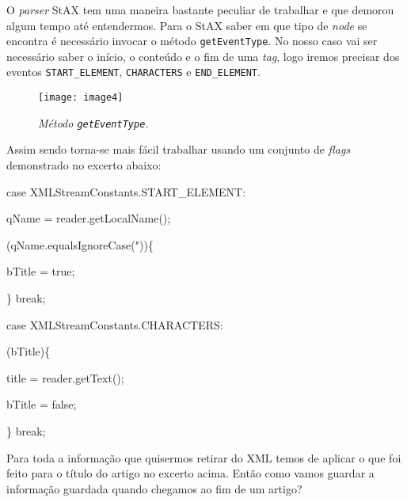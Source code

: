 \documentclass[a4paper,12pt]{report}
\newcommand\tab[1][1cm]{\hspace*{#1}}
\begin{document}
O {\sl parser} {\sf StAX} tem uma maneira bastante peculiar de trabalhar e que demorou algum tempo até entendermos. Para o {\sf StAX} saber em que tipo de {\sl node} se encontra é necessário invocar o método {\tt getEventType}. No nosso caso vai ser necessário saber o início, o conteúdo e o fim de uma {\sl tag}, logo iremos precisar dos eventos {\tt START\_ELEMENT}, {\tt CHARACTERS} e {\tt END\_ELEMENT}.

\begin{figure}[h]
	\centering
	\texttt{[image: image4]}
	\caption{\small\sl Método {\tt\footnotesize getEventType}.}
	\captionsetup[figure]{list=yes}
\end{figure}

Assim sendo torna-se mais fácil trabalhar usando um conjunto de {\sl flags} demonstrado no excerto abaixo:

\begin{tcolorbox}[width=\textwidth,colback={darkgray},title={\sf Excerto 2.2: Como recolher o título do artigo.},outer arc=2mm,colupper=white]{\footnotesize\tt
		
	{\color{brightpink}case} {\color{lightblue}XMLStreamConstants}{\color{brightpink}.}{\color{newpink}START\_ELEMENT}{\color{brightpink}:}

    \tab {\color{lightblue}String} qName {\color{brightpink}=} reader{\color{brightpink}.}getLocalName();

	\tab {\color{brightpink}if}(qName{\color{brightpink}.}equalsIgnoreCase({\color{deadyellow}{"title}}\color{deadyellow}"\color{white}))\{
		
		\tab \tab bTitle {\color{brightpink}=} {\color{newpink}true};
	
	\tab \}
	{\color{brightpink}break};
	
	\tab \tab {\color{darkgray}...}
	
	{\color{brightpink}case} {\color{lightblue}XMLStreamConstants}{\color{brightpink}.}{\color{newpink}CHARACTERS}{\color{brightpink}:}
	
	\tab {\color{brightpink}if}(bTitle)\{
	
	\tab \tab title {\color{brightpink}=} reader{\color{brightpink}.}getText();
	
	\tab \tab bTitle {\color{brightpink}=} {\color{newpink}false};
	
	\tab \}
	{\color{brightpink}break};

}
\end{tcolorbox} 

Para toda a informação que quisermos retirar do XML temos de aplicar o que foi feito para o título do artigo no excerto acima. Então como vamos guardar a informação guardada quando chegamos ao fim de um artigo? 
\end{document}
